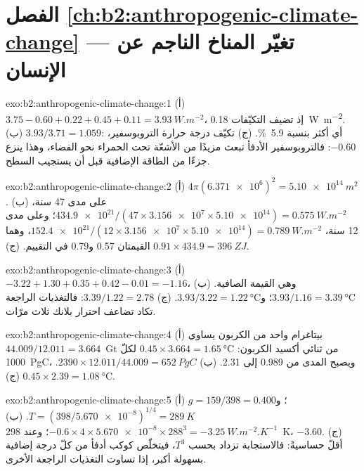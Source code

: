 \section*{الفصل \ref{ch:b2:anthropogenic-climate-change} --- تغيّر المناخ الناجم عن الإنسان}

\begin{solution}{exo:b2:anthropogenic-climate-change:1}
(أ) $3.75 - 0.60 + 0.22 + 0.45 + 0.11 = \qty{3.93}{W.m^{-2}}$، إذ تضيف التكيّفات
\qty{0.18}{W.m^{-2}}. (ب) $3.93/3.71 = 1.059$: أي أكثر بنسبة \qty{5.9}{\percent}. (ج) تكيّف درجة حرارة
التروبوسفير، $-0.60$: فالتروبوسفير الأدفأ تبعث مزيدًا من الأشعّة تحت الحمراء نحو الفضاء، وهذا ينزع
جزءًا من الطاقة الإضافية قبل أن يستجيب السطح.
\end{solution}

\begin{solution}{exo:b2:anthropogenic-climate-change:2}
(أ) $4\pi(\num{6.371e6})^2 = \qty{5.10e14}{m^2}$. (ب) على مدى 47 سنة، $\num{434.9e21}/(47 \times
\num{3.156e7} \times \num{5.10e14}) = \qty{0.575}{W.m^{-2}}$؛ وعلى مدى 12 سنة، $\num{152.4e21}/(12
\times \num{3.156e7} \times \num{5.10e14}) = \qty{0.789}{W.m^{-2}}$، وهما القيمتان 0.57 و0.79 في
التقييم. (ج) $0.91 \times 434.9 = \qty{396}{ZJ}$.
\end{solution}

\begin{solution}{exo:b2:anthropogenic-climate-change:3}
(أ) $-3.22 + 1.30 + 0.35 + 0.42 - 0.01 = \num{-1.16}$، وهي القيمة الصافية. (ب) $3.93/1.16 =
\qty{3.39}{\celsius}$؛ و$3.93/3.22 = \qty{1.22}{\celsius}$. (ج) $3.39/1.22 = 2.78$: فالتغذيات الراجعة
تكاد تضاعف احترار بلانك ثلاث مرّات.
\end{solution}

\begin{solution}{exo:b2:anthropogenic-climate-change:4}
(أ) بيتاغرام واحد من الكربون يساوي $44.009/12.011 = 3.664$~Gt من ثنائي أكسيد الكربون: $0.45 \times 3.664 =
\qty{1.65}{\celsius}$ لكلّ \qty{1000}{PgC}، ويصبح المدى من 0.989 إلى 2.31. (ب) $2390 \times
12.011/44.009 = \qty{652}{PgC}$. (ج) $0.45 \times 2.39 = \qty{1.08}{\celsius}$.
\end{solution}

\begin{solution}{exo:b2:anthropogenic-climate-change:5}
(أ) $g = 159/398 = 0.400$؛ و$T = (398/\num{5.670e-8})^{1/4} = \qty{289}{K}$. (ب) $-0.6 \times 4
\times \num{5.670e-8} \times 288^3 = \qty{-3.25}{W.m^{-2}.K^{-1}}$؛ وعند \qty{298}{K}، $-3.60$.
(ج) أقلّ حساسيةً: فالاستجابة تزداد بحسب $T^3$، فيتخلّص كوكب أدفأ من كلّ درجة إضافية
بسهولة أكبر، إذا تساوت التغذيات الراجعة الأخرى.
\end{solution}

